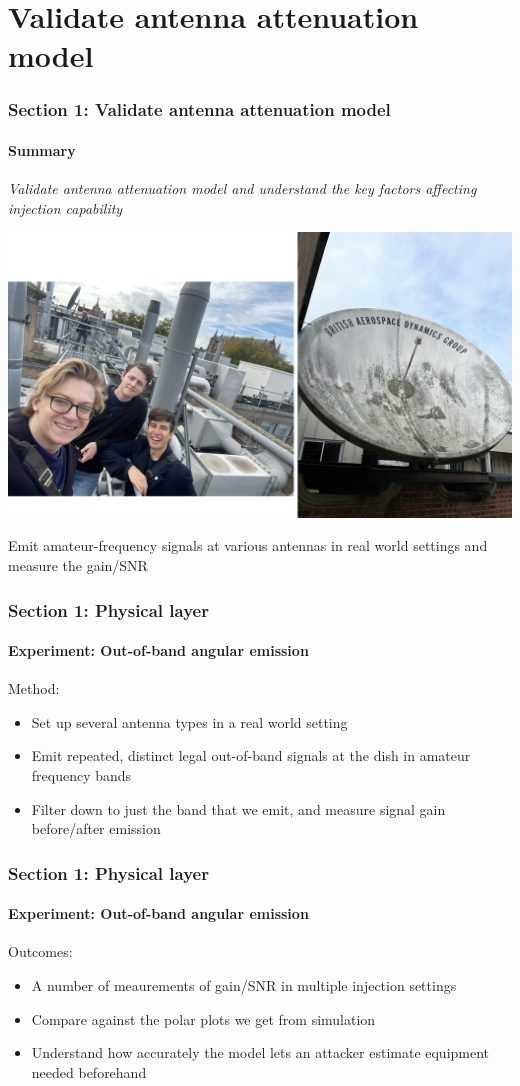 \documentclass{beamer}
\begin{document}
\section{Validate antenna attenuation model}

\begin{frame}
  \frametitle{Section 1: Validate antenna attenuation model}
  \framesubtitle{Summary}
  \textit{Validate antenna attenuation model and understand the key factors affecting injection capability}

  \centering
  \includegraphics[width=0.8\columnwidth]{images/photos/dishes.jpg}

  Emit amateur-frequency signals at various antennas in real world settings and measure the gain/SNR
\end{frame}

\begin{frame}
  \frametitle{Section 1: Physical layer}
  \framesubtitle{Experiment: Out-of-band angular emission}

  Method:
  \begin{itemize}
    \item Set up several antenna types in a real world setting
    \item Emit repeated, distinct legal out-of-band signals at the dish in amateur frequency bands
    \item Filter down to just the band that we emit, and measure signal gain before/after emission
  \end{itemize}
\end{frame}

\begin{frame}
  \frametitle{Section 1: Physical layer}
  \framesubtitle{Experiment: Out-of-band angular emission}

  Outcomes:
  \begin{itemize}
    \item A number of meaurements of gain/SNR in multiple injection settings
    \item Compare against the polar plots we get from simulation
    \item Understand how accurately the model lets an attacker estimate equipment needed beforehand
  \end{itemize}
\end{frame}
\end{document}
